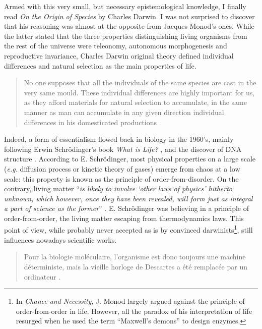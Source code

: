 Armed with this very small, but necessary epistemological knowledge, I finally read \textit{On the Origin of Species} by Charles Darwin. I was not surprised to discover that his reasoning was almost at the opposite from Jacques Monod's ones. While the latter stated that the three properties distinguishing living organisms from the rest of the universe were teleonomy, autonomous morphogenesis and reproductive invariance, Charles Darwin original theory defined individual differences and natural selection as the main properties of life.

\begin{quote}
No one supposes that all the individuals of the same species are cast in the very same mould. These individual differences are highly important for us, as they afford materials for natural selection to accumulate, in the same manner as man can accumulate in any given direction individual differences in his domesticated productions \citep{darwin-1859}.
\end{quote}

Indeed, a form of essentialism flowed back in biology in the 1960's, mainly following Erwin Schr\"odinger's book \textit{What is Life?} \citep{schrodinger-1944}, and the discover of DNA structure \citep{avery-et-al-1944,watson-et-al-1953}. According to E. Schr\"odinger, most physical properties on a large scale (\textit{e.g.} diffusion process or kinetic theory of gases) emerge from chaos at a low scale: this property is known as the principle of order-from-disorder. On the contrary, living matter ``\textit{is likely to involve `other laws of physics' hitherto unknown, which however, once they have been revealed, will form just as integral a part of science as the former}'' \citep{schrodinger-1944}. E. Schr\"odinger was believing in a principle of order-from-order, the living matter escaping from thermodynamics laws. This point of view, while probably never accepted as is by convinced darwinists\footnote{In \textit{Chance and Necessity}, J. Monod largely argued against the principle of order-from-order in life. However, all the paradox of his interpretation of life resurged when he used the term ``Maxwell's demons'' to design enzymes.}, still influences nowadays scientific works.

\begin{quote}
Pour la biologie mol\'{e}culaire, l'organisme est donc toujours une machine d\'{e}terministe, mais la vieille horloge de Descartes a \'{e}t\'{e} remplac\'{e}e par un ordinateur \citep{kupiec-2008}.
\end{quote}


